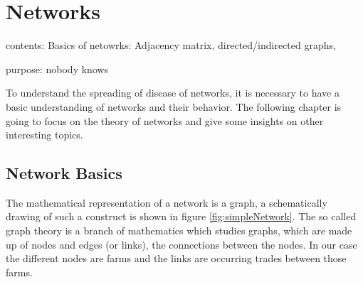 \section{Networks}\label{chap:networksBasics}
contents: Basics of netowrks: Adjacency matrix, directed/indirected graphs, 

purpose: nobody knows


To understand the spreading of disease of networks, it is necessary to have a basic understanding of networks and their behavior. The following chapter is going to focus on the theory of networks and give some insights on other interesting topics.
\subsection{Network Basics}
The mathematical representation of a network is a graph, a schematically drawing of such a construct is shown in figure \ref{fig:simpleNetwork}. The so called graph theory is a branch of mathematics which studies graphs, which are made up of nodes and edges (or links), the connections between the nodes. In our case the different nodes are farms and the links are occurring trades between those farms.
